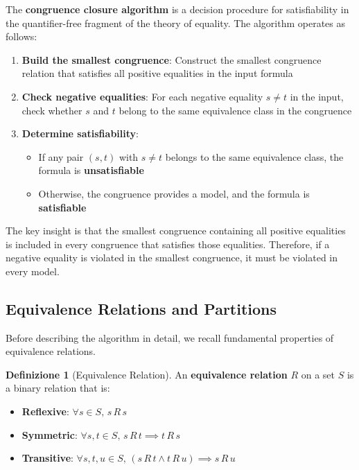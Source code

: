 \documentclass[11pt,a4paper]{article}
\theoremstyle{definition}
\newtheorem{definition}{Definizione}[section]
\theoremstyle{plain}
\theoremstyle{remark}
\begin{document}
The \textbf{congruence closure algorithm} is a decision procedure for satisfiability in the quantifier-free fragment of the theory of equality. The algorithm operates as follows:

\begin{enumerate}
    \item \textbf{Build the smallest congruence}: Construct the smallest congruence relation that satisfies all positive equalities in the input formula
    \item \textbf{Check negative equalities}: For each negative equality $s \neq t$ in the input, check whether $s$ and $t$ belong to the same equivalence class in the congruence
    \item \textbf{Determine satisfiability}:
    \begin{itemize}
        \item If any pair $(s, t)$ with $s \neq t$ belongs to the same equivalence class, the formula is \textbf{unsatisfiable}
        \item Otherwise, the congruence provides a model, and the formula is \textbf{satisfiable}
    \end{itemize}
\end{enumerate}

The key insight is that the smallest congruence containing all positive equalities is included in every congruence that satisfies those equalities. Therefore, if a negative equality is violated in the smallest congruence, it must be violated in every model.

\subsection{Equivalence Relations and Partitions}

Before describing the algorithm in detail, we recall fundamental properties of equivalence relations.

\begin{definition}[Equivalence Relation]
An \textbf{equivalence relation} $R$ on a set $S$ is a binary relation that is:
\begin{itemize}
    \item \textbf{Reflexive}: $\forall s \in S, \, s \, R \, s$
    \item \textbf{Symmetric}: $\forall s, t \in S, \, s \, R \, t \implies t \, R \, s$
    \item \textbf{Transitive}: $\forall s, t, u \in S, \, (s \, R \, t \wedge t \, R \, u) \implies s \, R \, u$
\end{itemize}
\end{definition}
\end{document}

